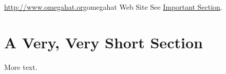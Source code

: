 \documentclass{article}
\begin{document}
\url{http://www.omegahat.org}{omegahat Web Site}
See \hyperref[sec:MySection]{Important Section}.



\section{A Very, Very Short Section}
\label{sec:MySection}
More text.
\end{document}
